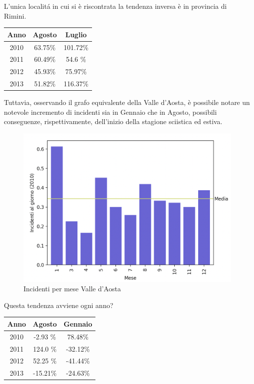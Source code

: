 \documentclass[a4paper]{report}
\begin{document}
L'unica localit\'a in cui si è riscontrata la tendenza inversa è in provincia 
di Rimini.


\begin{center}
    \def\arraystretch{1.5}%
    \begin{tabular}{ |c|c|c| } 
    \hline
    Anno & Agosto & Luglio \\ 
    \hline
    2010 & 63.75\% & 101.72\% \\ 
    2011 & 60.49\% & 54.6 \%  \\
    2012 & 45.93\% & 75.97\%  \\
    2013 & 51.82\% & 116.37\% \\
    \hline
    \end{tabular}
\end{center}

Tuttavia, osservando il grafo equivalente della Valle d'Aosta, è possibile notare 
un notevole incremento di incidenti sia in Gennaio che in Agosto, possibili 
conseguenze, rispettivamente, dell'inizio della stagione sciistica ed estiva.

\begin{figure}
    \includegraphics[width=\linewidth]{../src/incidenti/incidenti_senza_coords/mese_incidenti/aosta_mese.png}
    \caption{Incidenti per mese Valle d'Aosta}
    \label{fig:aosta}
\end{figure}

Questa tendenza avviene ogni anno?

\begin{center}
    \def\arraystretch{1.5}%
    \begin{tabular}{ |c|c|c| } 
    \hline
    Anno & Agosto & Gennaio \\ 
    \hline
    2010 & -2.93 \% & 78.48\%  \\ 
    2011 & 124.0 \% & -32.12\% \\
    2012 & 52.25 \% & -41.44\% \\
    2013 & -15.21\% & -24.63\% \\
    \hline
    \end{tabular}
\end{center}
\end{document}
